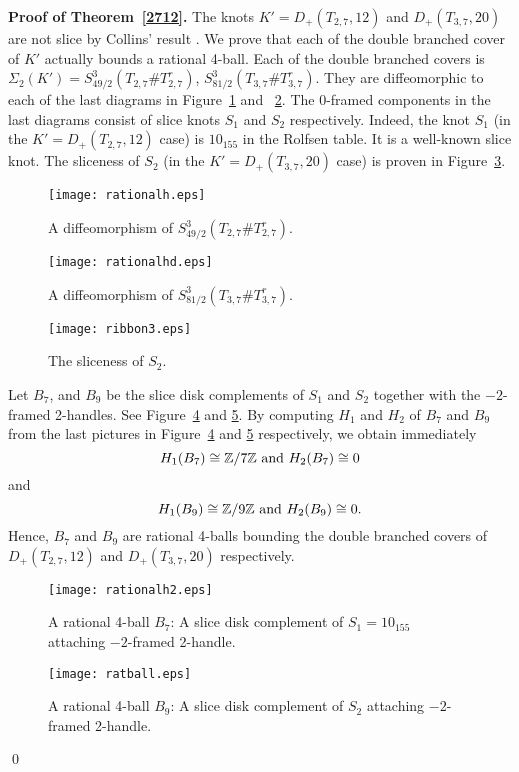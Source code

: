 \documentclass[11pt]{amsart}
\begin{document}
{\bf Proof of Theorem~\ref{2712}.}
The knots $K'=D_+(T_{2,7},12)$ and $D_+(T_{3,7},20)$ are not slice by Collins' result \cite{JC}.
We prove that each of the double branched cover of $K'$ actually bounds a rational 4-ball.
Each of the double branched covers is $\Sigma_2(K')=S^3_{49/2}(T_{2,7}\#T_{2,7}^r)$, $S^3_{81/2}(T_{3,7}\#T_{3,7}^r)$.
They are diffeomorphic to each of the last diagrams in {\sc Figure}~\ref{rationalh} and ~\ref{rationalhd}.
The $0$-framed components in the last diagrams consist of slice knots $S_1$ and $S_2$ respectively.
Indeed, the knot $S_1$ (in the $K'=D_+(T_{2,7},12)$ case) is $10_{155}$ in the Rolfsen table.
It is a well-known slice knot.
The sliceness of $S_2$ (in the $K'=D_+(T_{3,7},20)$ case) is proven in {\sc Figure}~\ref{ribbon3}.
\begin{figure}[bthp]
\begin{center}\texttt{[image: rationalh.eps]}\caption{A diffeomorphism of $S^3_{49/2}(T_{2,7}\#T_{2,7}^r)$.}\label{rationalh}\end{center}
\end{figure}
\begin{figure}[bthp]
\begin{center}\texttt{[image: rationalhd.eps]}\caption{A diffeomorphism of $S^3_{81/2}(T_{3,7}\#T_{3,7}^r)$.}\label{rationalhd}\end{center}
\end{figure}
\begin{figure}[btbp]
\begin{center}\texttt{[image: ribbon3.eps]}\caption{The sliceness of $S_2$.}\label{ribbon3}\end{center}
\end{figure}
Let $B_7$, and $B_9$ be the slice disk complements of $S_1$ and $S_2$ together with the $-2$-framed 2-handles.
See {\sc Figure}~\ref{rationalh2} and \ref{ratb}.
By computing $H_1$ and $H_2$ of $B_7$ and $B_9$ from the last pictures in {\sc Figure}~\ref{rationalh2} and \ref{ratb} respectively, we obtain immediately
$$H_1(B_7)\cong {\Bbb Z}/7{\Bbb Z}\text{ and }H_2(B_7)\cong 0$$
and 
$$H_1(B_9)\cong {\Bbb Z}/9{\Bbb Z}\text{ and }H_2(B_9)\cong 0.$$
Hence, $B_7$ and $B_9$ are rational 4-balls bounding the double branched covers of $D_+(T_{2,7},12)$ and $D_+(T_{3,7},20)$ respectively.
\begin{figure}[btbp]
\begin{center}\texttt{[image: rationalh2.eps]}\caption{A rational 4-ball $B_7$: A slice disk complement of $S_1=10_{155}$ attaching $-2$-framed 2-handle.}\label{rationalh2}\end{center}
\end{figure}
\begin{figure}[btbp]
\begin{center}\texttt{[image: ratball.eps]}\caption{A rational 4-ball $B_9$: A slice disk complement of $S_2$ attaching $-2$-framed 2-handle.}\label{ratb}\end{center}
\end{figure}
\qed
\end{document}
